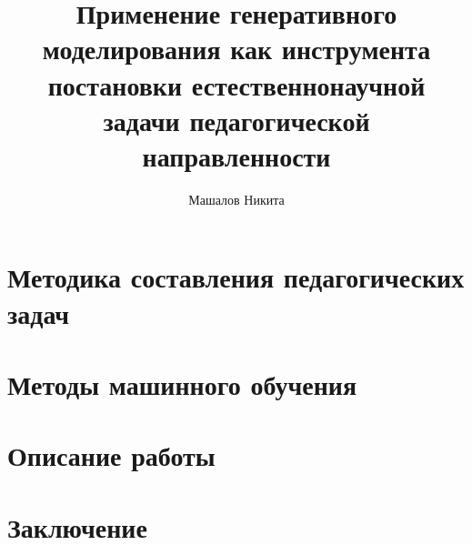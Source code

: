 \documentclass{mipt-thesis-bs}
\title{Применение генеративного моделирования как инструмента постановки естественнонаучной задачи педагогической направленности}
\author{Машалов Никита}
\begin{document}


\chapter{Методика составления педагогических задач}

\chapter{Методы машинного обучения}

\chapter{Описание работы}

\chapter{Заключение}



\printbib
\end{document}
